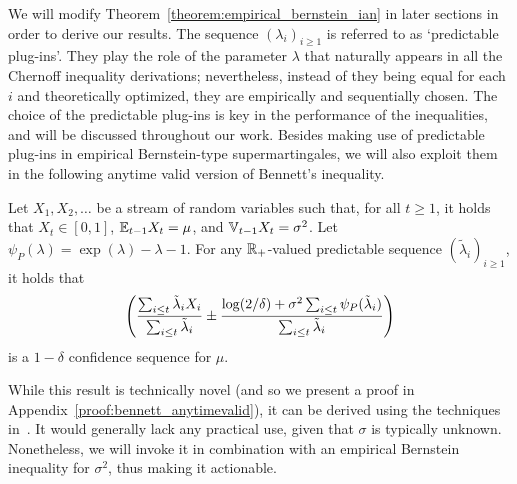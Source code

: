  We will modify Theorem~\ref{theorem:empirical_bernstein_ian}  in later sections in order to derive our results. The sequence $(\lambda_i)_{i \geq 1}$ is referred to as `predictable plug-ins'. They play the role of the parameter $\lambda$ that naturally appears in all the Chernoff inequality derivations; nevertheless, instead of they being equal for each $i$ and theoretically optimized, they are empirically and sequentially chosen. The choice of the predictable plug-ins is key in the performance of the inequalities, and will be discussed throughout our work.  Besides making use of predictable plug-ins in empirical Bernstein-type supermartingales, we will also exploit them in the following anytime valid version of Bennett's inequality.
\begin{theorem}  \label{theorem:bennett_anytimevalid}
    Let $X_1, X_2, \ldots$ be a stream of random variables such that, for all $t \geq 1$, it holds that $X_t \in [0, 1]$, $\mathbb{E}_{t-1}X_t = \mu$, and $\mathbb{V}_{t-1} X_t = \sigma^2$. Let $\psi_P(\lambda) = \exp(\lambda) - \lambda - 1$. For any $\mathbb{R}_+$-valued predictable sequence $(\tilde\lambda_i)_{i \geq 1}$, it holds that
     \begin{align*}
         \left( \frac{\sum_{i \leq t} \tilde \lambda_i X_i}{\sum_{i \leq t} \tilde \lambda_i} \pm \frac{\log(2/\delta) + \sigma^2\sum_{i \leq t} \psi_P(\tilde \lambda_i)}{\sum_{i \leq t} \tilde \lambda_i} \right)
     \end{align*}
     is a $1-\delta$ confidence sequence for $\mu$.
\end{theorem}
While this result is technically novel (and so we present a proof in Appendix~\ref{proof:bennett_anytimevalid}), it can be derived using the techniques in~\cite{howard2020time,waudby2024estimating}. It would generally lack any practical use, given that $\sigma$ is typically unknown. Nonetheless, we will invoke it in combination with an empirical Bernstein inequality for $\sigma^2$, thus making it actionable.  

